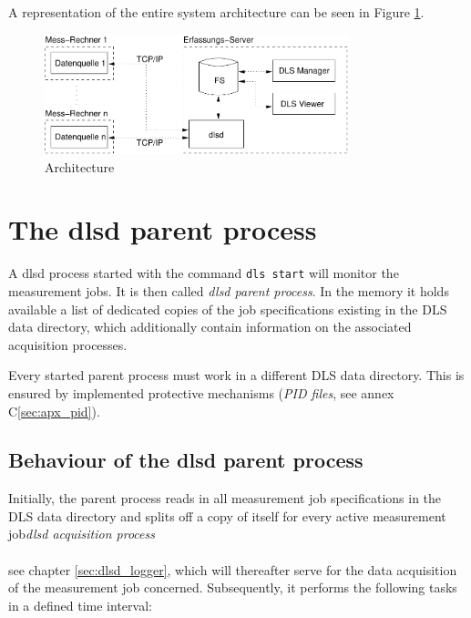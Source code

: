 \documentclass[a4paper,12pt,BCOR6mm,bibtotoc,idxtotoc]{scrbook}
\begin{document}
A representation of the entire system architecture
can be seen in Figure \ref{fig:arch}.

\begin{figure}[htb] \begin{center} \includegraphics[width=250pt]{bilder/arch} \end{center} \caption{Architecture} \label{fig:arch} \end{figure}


\section{The dlsd parent process} \label{sec:dlsd_mother} 

A dlsd process started with the command \texttt{dls start} will monitor the measurement jobs. It is then called \textit{dlsd parent process}. In the memory it holds available a list of dedicated copies of the job specifications existing in the DLS data directory, which additionally contain information on the associated acquisition processes.

Every started parent process must work in a different DLS data directory. This is ensured by implemented protective mechanisms (\textit{PID files}, see annex C\ref{sec:apx_pid}).


\subsection{Behaviour of the dlsd parent process} \label{sec:dlsd_mother_behaviour}

Initially, the parent process reads in all measurement job specifications in the DLS data directory and splits off a copy of itself for every active measurement job\textit{dlsd acquisition process\\\\}see chapter \ref{sec:dlsd_logger}, which will thereafter serve for the data acquisition of the measurement job concerned. Subsequently, it performs the following tasks in a defined time interval:
\end{document}
